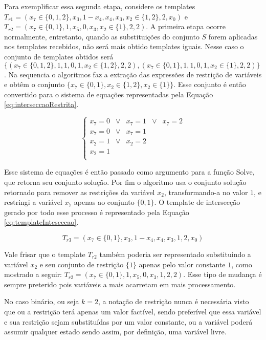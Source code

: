 Para exemplificar essa segunda etapa, considere os templates $T_{r1} = (x_7 \in \{0,1,2\},x_3,1-x_4,x_4,x_3,x_2 \in \{1,2\},2,x_0)$ e $T_{r2} = (x_7 \in \{0,1\},1,x_5,0,x_3,x_2 \in \{1\},2,2)$. A primeira etapa ocorre normalmente, entretanto, quando as substituições do conjunto $S$ forem aplicadas nos templates recebidos, não será mais obtido templates iguais. Nesse caso o conjunto de templates obtidos será $\{(x_7 \in \{0,1,2\}, 1, 1, 0, 1, x_2 \in \{1,2\}, 2, 2), (x_7 \in \{0,1\}, 1, 1, 0, 1, x_2 \in \{1\}, 2, 2)\}$. Na sequencia o algoritmos faz a extração das expressões de restrição de variáveis e obtêm o conjunto $\{x_7 \in \{0,1\}, x_2 \in \{1,2\}, x_2 \in \{1\} \}$. Esse conjunto é então convertido para o sistema de equações representadas pela Equação \ref{eq:interseccaoRestrita}.

\begin{equation}
\left\{\begin{matrix}
x_7	  = 0 	& \vee &	x_7	=	1 & \vee &	x_7	= 2	\\ 
x_7   = 0 	& \vee &	x_7	=	1					\\ 
x_2   = 1 	& \vee &	x_2	=	2					\\ 
x_2	  =	1											\\ 
\end{matrix}\right.
\label{eq:interseccaoRestrita}
\end{equation}

Esse sistema de equações é então passado como argumento para a função Solve, que retorna seu conjunto solução. Por fim o algoritmo usa o conjunto solução retornado para remover as restrições da variável $x_2$, transformando-a no valor $1$, e restringi a variável $x_7$ apenas ao conjunto $\{0,1\}$. O template de intersecção gerado por todo esse processo é representado pela Equação \ref{eq:templateIntescecao}.

\begin{equation}
T_{r3} = (x_7 \in \{0,1\}, x_3, 1-x_4, x_4, x_3, 1, 2, x_0)
\label{eq:templateIntescecao}
\end{equation}

Vale frisar que o template $T_{r2}$ também poderia ser representado substituindo a variável $x_2$ e seu conjunto de restrição $\{1\}$ apenas pelo valor constante $1$, como mostrado a seguir: $T_{r2} = (x_7 \in \{0,1\}, 1, x_5, 0, x_3, 1, 2, 2)$. Esse tipo de mudança é sempre preterido pois variáveis a mais acarretam em mais processamento.

No caso binário, ou seja $k = 2$, a notação de restrição nunca é necessária visto que ou a restrição terá apenas um valor factível, sendo preferível que essa variável e sua restrição sejam substituídas por um valor constante, ou a variável poderá assumir qualquer estado sendo assim, por definição, uma variável livre.